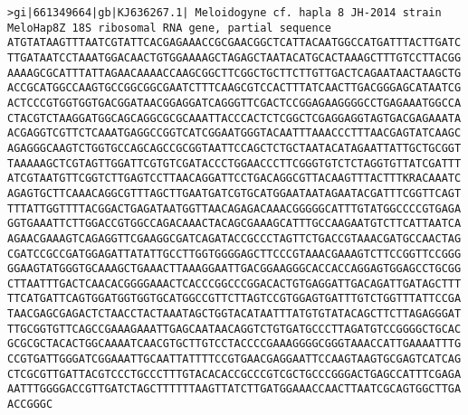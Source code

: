 \documentclass[11pt]{article}
\begin{document}
\begin{Verbatim}[commandchars=\\\{\}]
>gi|661349664|gb|KJ636267.1| Meloidogyne cf. hapla 8 JH-2014 strain MeloHap8Z 18S ribosomal RNA gene, partial sequence
ATGTATAAGTTTAATCGTATTCACGAGAAACCGCGAACGGCTCATTACAATGGCCATGATTTACTTGATC
TTGATAATCCTAAATGGACAACTGTGGAAAAGCTAGAGCTAATACATGCACTAAAGCTTTGTCCTTACGG
AAAAGCGCATTTATTAGAACAAAACCAAGCGGCTTCGGCTGCTTCTTGTTGACTCAGAATAACTAAGCTG
ACCGCATGGCCAAGTGCCGGCGGCGAATCTTTCAAGCGTCCACTTTATCAACTTGACGGGAGCATAATCG
ACTCCCGTGGTGGTGACGGATAACGGAGGATCAGGGTTCGACTCCGGAGAAGGGGCCTGAGAAATGGCCA
CTACGTCTAAGGATGGCAGCAGGCGCGCAAATTACCCACTCTCGGCTCGAGGAGGTAGTGACGAGAAATA
ACGAGGTCGTTCTCAAATGAGGCCGGTCATCGGAATGGGTACAATTTAAACCCTTTAACGAGTATCAAGC
AGAGGGCAAGTCTGGTGCCAGCAGCCGCGGTAATTCCAGCTCTGCTAATACATAGAATTATTGCTGCGGT
TAAAAAGCTCGTAGTTGGATTCGTGTCGATACCCTGGAACCCTTCGGGTGTCTCTAGGTGTTATCGATTT
ATCGTAATGTTCGGTCTTGAGTCCTTAACAGGATTCCTGACAGGCGTTACAAGTTTACTTTKRACAAATC
AGAGTGCTTCAAACAGGCGTTTAGCTTGAATGATCGTGCATGGAATAATAGAATACGATTTCGGTTCAGT
TTTATTGGTTTTACGGACTGAGATAATGGTTAACAGAGACAAACGGGGGCATTTGTATGGCCCCGTGAGA
GGTGAAATTCTTGGACCGTGGCCAGACAAACTACAGCGAAAGCATTTGCCAAGAATGTCTTCATTAATCA
AGAACGAAAGTCAGAGGTTCGAAGGCGATCAGATACCGCCCTAGTTCTGACCGTAAACGATGCCAACTAG
CGATCCGCCGATGGAGATTATATTGCCTTGGTGGGGAGCTTCCCGTAAACGAAAGTCTTCCGGTTCCGGG
GGAAGTATGGGTGCAAAGCTGAAACTTAAAGGAATTGACGGAAGGGCACCACCAGGAGTGGAGCCTGCGG
CTTAATTTGACTCAACACGGGGAAACTCACCCGGCCCGGACACTGTGAGGATTGACAGATTGATAGCTTT
TTCATGATTCAGTGGATGGTGGTGCATGGCCGTTCTTAGTCCGTGGAGTGATTTGTCTGGTTTATTCCGA
TAACGAGCGAGACTCTAACCTACTAAATAGCTGGTACATAATTTATGTGTATACAGCTTCTTAGAGGGAT
TTGCGGTGTTCAGCCGAAAGAAATTGAGCAATAACAGGTCTGTGATGCCCTTAGATGTCCGGGGCTGCAC
GCGCGCTACACTGGCAAAATCAACGTGCTTGTCCTACCCCGAAAGGGGCGGGTAAACCATTGAAAATTTG
CCGTGATTGGGATCGGAAATTGCAATTATTTTCCGTGAACGAGGAATTCCAAGTAAGTGCGAGTCATCAG
CTCGCGTTGATTACGTCCCTGCCCTTTGTACACACCGCCCGTCGCTGCCCGGGACTGAGCCATTTCGAGA
AATTTGGGGACCGTTGATCTAGCTTTTTTAAGTTATCTTGATGGAAACCAACTTAATCGCAGTGGCTTGA
ACCGGGC


\end{Verbatim}
\end{document}
